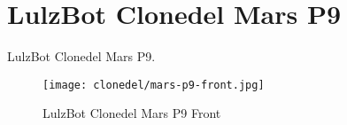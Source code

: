 %
%
%
%
%

\section{LulzBot Clonedel Mars P9}
LulzBot Clonedel Mars P9.

\begin{figure}[h!]
\texttt{[image: clonedel/mars-p9-front.jpg]}
 \caption{LulzBot Clonedel Mars P9 Front}
 \label{fig:clonedel-mars-p9-front}
\end{figure}


